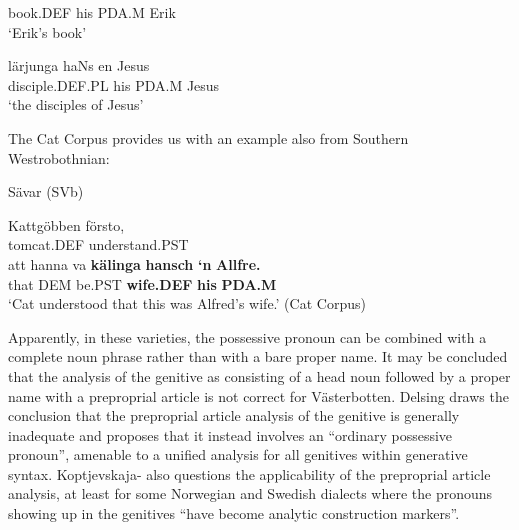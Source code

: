 book.DEF  his  PDA.M  Erik  \\

\glt ‘Erik’s book’

\z

\item 


 \ea\label{}
\gll lärjunga  haNs  en  Jesus\\


disciple.DEF.PL  his  PDA.M  Jesus\\

\glt ‘the disciples of Jesus’

\z

The Cat Corpus provides us with an example also from Southern Westrobothnian:


\item 

Sävar (SVb)



 \ea\label{}
\gll Kattgöbben  försto,\\


tomcat.DEF  understand.PST\\

 \ea\label{}
\gll att  hanna  va  \textbf{kälinga}\textbf{  hansch}\textbf{  ‘n}\textbf{  Allfre.}\\


that  DEM  be.PST  \textbf{wife.DEF} \textbf{his} \textbf{PDA.M} \\

\glt ‘Cat understood that this was Alfred’s wife.’ (Cat Corpus)

\z

Apparently, in these varieties, the possessive pronoun can be combined with a complete noun phrase rather than with a bare proper name. It may be concluded that the analysis of the genitive as consisting of a head noun followed by a proper name with a preproprial article is not correct for Västerbotten.  Delsing draws the conclusion that the preproprial article analysis of the genitive is generally inadequate and proposes that it instead involves an “ordinary possessive pronoun”, amenable to a unified analysis for all genitives within generative syntax. Koptjevskaja-\citet{Tamm2003} also questions the applicability of the preproprial article analysis, at least for some Norwegian and Swedish dialects where the pronouns showing up in the genitives “have become analytic construction markers”. 

